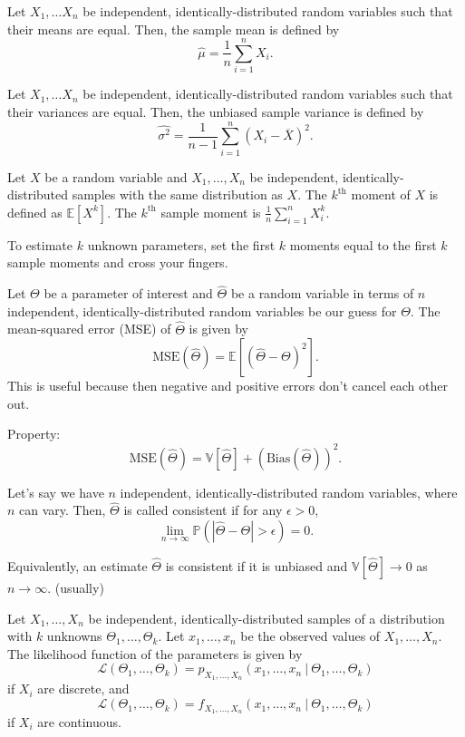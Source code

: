 \documentclass{article}
\begin{document}
\medskip
{}

    Let $X_1, \hdots X_n$ be independent, identically-distributed random variables such that their means are equal. Then, the sample mean is defined by $$\hat\mu = \frac1n\sum_{i=1}^nX_i.$$

\medskip
{}

    Let $X_1, \hdots X_n$ be independent, identically-distributed random variables such that their variances are equal. Then, the unbiased sample variance is defined by $$\hat{\sigma^2} = \frac1{n-1}\sum_{i=1}^n(X_i-\overline X)^2.$$

\medskip
{}

    Let $X$ be a random variable and $X_1, \hdots, X_n$ be independent, identically-distributed samples with the same distribution as $X$. The $k^\text{th}$ moment of $X$ is defined as $\mathbb E[X^k]$. The $k^\text{th}$ sample moment is $\frac1n \sum_{i=1}^nX_i^k$.

    To estimate $k$ unknown parameters, set the first $k$ moments equal to the first $k$ sample moments and cross your fingers.

\medskip
{}

    Let $\Theta$ be a parameter of interest and $\hat\Theta$ be a random variable in terms of $n$ independent, identically-distributed random variables be our guess for $\Theta$. The mean-squared error (MSE) of $\hat\Theta$ is given by \[\text{MSE}(\hat\Theta)=  \mathbb E[(\hat\Theta - \Theta)^2].\] This is useful because then negative and positive errors don't cancel each other out.

    Property: \[\text{MSE}(\hat\Theta) = \mathbb V[\hat\Theta] + (\text{Bias}(\hat\Theta))^2.\]

\medskip
{}

    Let's say we have $n$ independent, identically-distributed random variables, where $n$ can vary. Then, $\hat\Theta$ is called consistent if for any $\epsilon > 0$, \[\lim_{n\to\infty} \mathbb P(|\hat\Theta - \Theta| > \epsilon) = 0.\]

    Equivalently, an estimate $\hat\Theta$ is consistent if it is unbiased and $\mathbb V[\hat\Theta] \to 0$ as $n \to \infty$. (usually)

\medskip
{}

    Let $X_1, \hdots, X_n$ be independent, identically-distributed samples of a distribution with $k$ unknowns $\Theta_1, \hdots, \Theta_k$. Let $x_1, \hdots, x_n$ be the observed values of $X_1, \hdots, X_n$. The likelihood function of the parameters is given by
    $$\mathcal L(\Theta_1, \hdots, \Theta_k) = p_{X_1, \hdots, X_n}(x_1, \hdots, x_n~|~\Theta_1, \hdots, \Theta_k)$$ if $X_i$ are discrete, and
    $$\mathcal L(\Theta_1, \hdots, \Theta_k) = f_{X_1, \hdots, X_n}(x_1, \hdots, x_n~|~\Theta_1, \hdots, \Theta_k)$$ if $X_i$ are continuous.
\end{document}
